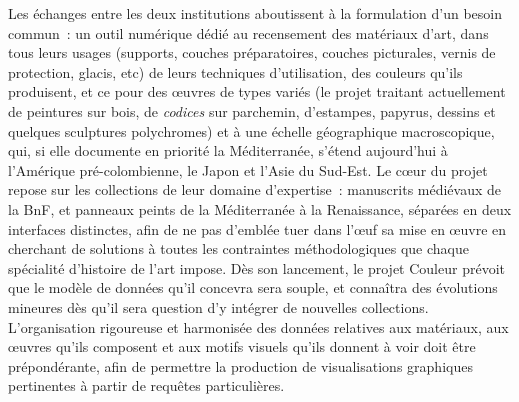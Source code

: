 \documentclass[a4paper,12pt, twoside]{book}
\begin{document}
Les échanges entre les deux institutions aboutissent à la formulation d’un besoin commun~: un outil numérique dédié au recensement des matériaux d’art, dans tous leurs usages (supports, couches préparatoires, couches picturales, vernis de protection, glacis, etc) de leurs techniques d’utilisation, des couleurs qu’ils produisent, et ce pour des œuvres de types variés (le projet traitant actuellement de peintures sur bois, de \textit{codices} sur parchemin, d’estampes, papyrus, dessins et quelques sculptures polychromes) et à une échelle géographique macroscopique, qui, si elle documente en priorité la Méditerranée, s’étend aujourd’hui à l’Amérique pré-colombienne, le Japon et l’Asie du Sud-Est. Le cœur du projet repose sur les collections de leur domaine d’expertise~: manuscrits médiévaux de la BnF, et panneaux peints de la Méditerranée à la Renaissance, séparées en deux interfaces distinctes, afin de ne pas d’emblée tuer dans l’œuf sa mise en œuvre en cherchant de solutions à toutes les contraintes méthodologiques que chaque spécialité d’histoire de l’art impose. Dès son lancement, le projet Couleur prévoit que le modèle de données qu’il concevra sera souple, et connaîtra des évolutions mineures dès qu’il sera question d’y intégrer de nouvelles collections. L’organisation rigoureuse et harmonisée des données relatives aux matériaux, aux œuvres qu’ils composent et aux motifs visuels qu’ils donnent à voir doit être prépondérante, afin de permettre la production de visualisations graphiques pertinentes à partir de requêtes particulières.
\end{document}
